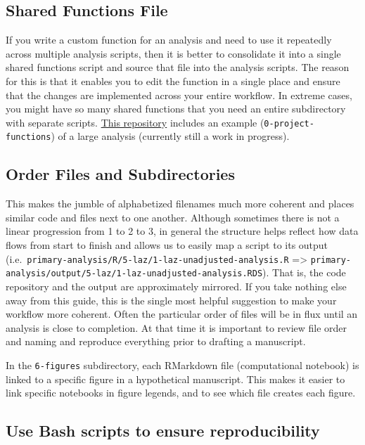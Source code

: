 \documentclass[]{book}
\begin{document}
\hypertarget{shared-functions-file}{%
\subsection{Shared Functions File}\label{shared-functions-file}}

If you write a custom function for an analysis and need to use it repeatedly across multiple analysis scripts, then it is better to consolidate it into a single shared functions script and source that file into the analysis scripts. The reason for this is that it enables you to edit the function in a single place and ensure that the changes are implemented across your entire workflow. In extreme cases, you might have so many shared functions that you need an entire subdirectory with separate scripts. \href{https://github.com/HBGD-UCB/ki-longitudinal-manuscripts/}{This repository} includes an example (\texttt{0-project-functions}) of a large analysis (currently still a work in progress).

\hypertarget{order-files-and-subdirectories}{%
\subsection{Order Files and Subdirectories}\label{order-files-and-subdirectories}}

This makes the jumble of alphabetized filenames much more coherent and places similar code and files next to one another. Although sometimes there is not a linear progression from 1 to 2 to 3, in general the structure helps reflect how data flows from start to finish and allows us to easily map a script to its output (i.e.~\texttt{primary-analysis/R/5-laz/1-laz-unadjusted-analysis.R} =\textgreater{} \texttt{primary-analysis/output/5-laz/1-laz-unadjusted-analysis.RDS}). That is, the code repository and the output are approximately mirrored. If you take nothing else away from this guide, this is the single most helpful suggestion to make your workflow more coherent. Often the particular order of files will be in flux until an analysis is close to completion. At that time it is important to review file order and naming and reproduce everything prior to drafting a manuscript.

In the \texttt{6-figures} subdirectory, each RMarkdown file (computational notebook) is linked to a specific figure in a hypothetical manuscript. This makes it easier to link specific notebooks in figure legends, and to see which file creates each figure.

\hypertarget{use-bash-scripts-to-ensure-reproducibility}{%
\subsection{Use Bash scripts to ensure reproducibility}\label{use-bash-scripts-to-ensure-reproducibility}}
\end{document}
